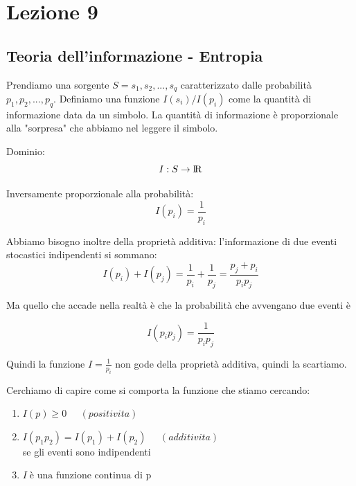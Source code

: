 \section*{Lezione 9}

\subsection*{Teoria dell'informazione - Entropia}

Prendiamo una sorgente $S = {s_1, s_2, ..., s_q}$ caratterizzato dalle probabilità $p_1, p_2, ... , p_q$.
Definiamo una funzione $I(s_i) / I(p_i)$ come la quantità di informazione data da un simbolo.
La quantità di informazione è proporzionale alla "sorpresa" che abbiamo nel leggere il simbolo.

Dominio:
\begin{equation*}
I:S\rightarrow {\rm I\!R}
\end{equation*} 

Inversamente proporzionale alla probabilità:
\begin{equation*}
I(p_i) = \frac{1}{p_i}
\end{equation*}

Abbiamo bisogno inoltre della proprietà additiva: l'informazione di due eventi stocastici indipendenti si sommano:
\begin{equation*}
I(p_i) + I(p_j) = \frac{1}{p_i} + \frac{1}{p_j} = \frac{p_j+p_i}{p_ip_j}
\end{equation*}

Ma quello che accade nella realtà è che la probabilità che avvengano due eventi è

\begin{equation*}
I(p_ip_j) = \frac{1}{p_ip_j}
\end{equation*}

Quindi la funzione $I=\frac{1}{p_i}$ non gode della proprietà additiva, quindi la scartiamo.

Cerchiamo di capire come si comporta la funzione che stiamo cercando:
\begin{enumerate}
	\item $I(p) \geq 0 \; \; \; \; \; (positivita)$
	\item $I(p_1p_2) = I(p_1) + I(p_2) \; \; \; \; \; (additivita)$\\
	se gli eventi sono indipendenti
	\item $I \; \text{è una funzione continua di p}$
\end{enumerate}

